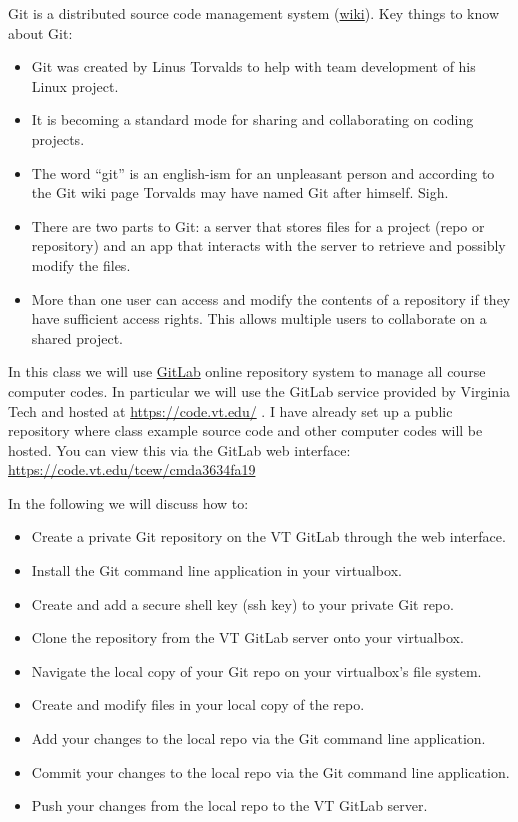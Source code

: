 Git is a distributed source code management system (\href{https://en.wikipedia.org/wiki/Git}{wiki}). Key things to know about Git: 
\begin{itemize}
    \item Git was created by Linus Torvalds to help with team development of his Linux project.
    \item It is becoming a standard mode for sharing and collaborating on coding projects.
    \item The word ``git'' is an english-ism for an unpleasant person and according to the Git wiki page Torvalds may have named Git after himself. Sigh.
    \item There are two parts to Git: a server that stores files for a project (repo or repository) and an app that interacts with the server to retrieve and possibly modify the files.
    \item More than one user can access and modify the contents of a repository if they have sufficient access rights. This allows multiple users to collaborate on a shared project.
\end{itemize}
In this class we will use \href{https://about.gitlab.com}{GitLab} online repository system to manage all course computer codes. In particular we will use the GitLab service provided by Virginia Tech and hosted at \href{https://code.vt.edu/}{https://code.vt.edu/} .  I have already set up a public repository where class example source code and other computer codes will be hosted. You can view this via the GitLab web interface: \href{https://code.vt.edu/tcew/cmda3634fa19}{https://code.vt.edu/tcew/cmda3634fa19}

\vspace{8pt}\noindent In the following we will discuss how to:

\begin{itemize}

    \item Create a private Git repository on the VT GitLab through the web interface.
    \item Install the Git command line application in your virtualbox.
    \item Create and add a secure shell key (ssh key) to your private Git repo.
    \item Clone the repository from the VT GitLab server onto your virtualbox.
    \item Navigate the local copy of your Git repo on your virtualbox's file system.
    \item Create and modify files in your local copy of the repo.
    \item Add your changes to the local repo via the Git command line application.
    \item Commit your changes to the local repo via the Git command line application.
    \item Push your changes from the local repo to the VT GitLab server.
\end{itemize}


